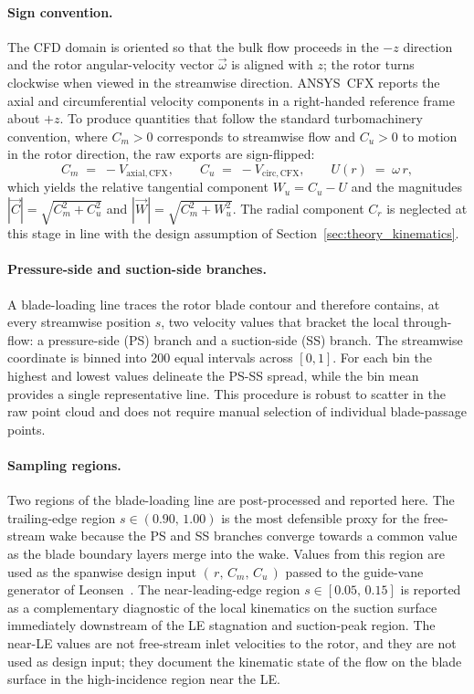 \paragraph{Sign convention.}
The CFD domain is oriented so that the bulk flow proceeds in the $-z$ direction and the rotor angular-velocity vector $\vec{\omega}$ is aligned with $z$; the rotor turns clockwise when viewed in the streamwise direction. ANSYS~CFX reports the axial and circumferential velocity components in a right-handed reference frame about $+z$. To produce quantities that follow the standard turbomachinery convention, where $C_m>0$ corresponds to streamwise flow and $C_u>0$ to motion in the rotor direction, the raw exports are sign-flipped:
\begin{equation}
C_m \;=\; -V_{\mathrm{axial},\mathrm{CFX}}, \qquad
C_u \;=\; -V_{\mathrm{circ},\mathrm{CFX}}, \qquad
U(r) \;=\; \omega\,r,
\label{eq:rdt_sign_convention}
\end{equation}
which yields the relative tangential component $W_u = C_u - U$ and the magnitudes $|\vec{C}|=\sqrt{C_m^{2}+C_u^{2}}$ and $|\vec{W}|=\sqrt{C_m^{2}+W_u^{2}}$. The radial component $C_r$ is neglected at this stage in line with the design assumption of Section~\ref{sec:theory_kinematics}.
 
\paragraph{Pressure-side and suction-side branches.}
A blade-loading line traces the rotor blade contour and therefore contains, at every streamwise position $s$, two velocity values that bracket the local through-flow: a pressure-side (PS) branch and a suction-side (SS) branch. The streamwise coordinate is binned into 200 equal intervals across $[0,1]$. For each bin the highest and lowest values delineate the PS-SS spread, while the bin mean provides a single representative line. This procedure is robust to scatter in the raw point cloud and does not require manual selection of individual blade-passage points.
 
\paragraph{Sampling regions.}
Two regions of the blade-loading line are post-processed and reported here. The trailing-edge region $s\in(0.90,\,1.00)$ is the most defensible proxy for the free-stream wake because the PS and SS branches converge towards a common value as the blade boundary layers merge into the wake. Values from this region are used as the spanwise design input $(\,r,\,C_m,\,C_u\,)$ passed to the guide-vane generator of Leonsen~\cite{Leonsen2025}. The near-leading-edge region $s\in[0.05,\,0.15]$ is reported as a complementary diagnostic of the local kinematics on the suction surface immediately downstream of the LE stagnation and suction-peak region. The near-LE values are not free-stream inlet velocities to the rotor, and they are not used as design input; they document the kinematic state of the flow on the blade surface in the high-incidence region near the LE.
 
